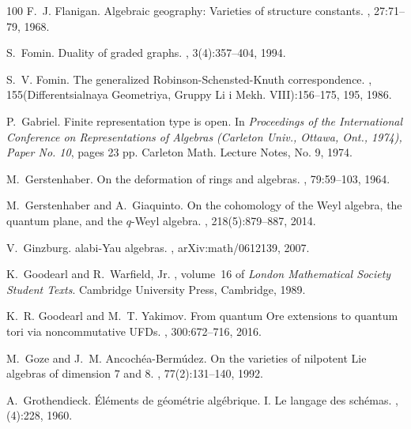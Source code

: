 \documentclass{commat}
\begin{document}
\begin{thebibliography}{100}
F.~J. Flanigan.
\newblock Algebraic geography: {V}arieties of structure constants.
, 27:71--79, 1968.

S.~Fomin.
\newblock Duality of graded graphs.
, 3(4):357--404, 1994.

S.~V. Fomin.
\newblock The generalized {R}obinson-{S}chensted-{K}nuth correspondence.
,
  155(Differentsial\cprime naya Geometriya, Gruppy Li i Mekh. VIII):156--175,
  195, 1986.

P.~Gabriel.
\newblock Finite representation type is open.
\newblock In {\em Proceedings of the {I}nternational {C}onference on
  {R}epresentations of {A}lgebras ({C}arleton {U}niv., {O}ttawa, {O}nt., 1974),
  {P}aper {N}o. 10}, pages 23 pp. Carleton Math. Lecture Notes, No. 9, 1974.

M.~Gerstenhaber.
\newblock On the deformation of rings and algebras.
, 79:59--103, 1964.

M.~Gerstenhaber and A.~Giaquinto.
\newblock On the cohomology of the {W}eyl algebra, the quantum plane, and the
  {$q$}-{W}eyl algebra.
, 218(5):879--887, 2014.

V.~Ginzburg.
alabi-{Y}au algebras.
, arXiv:math/0612139, 2007.

K.~Goodearl and R.~Warfield, Jr.
,
  volume~16 of {\em London Mathematical Society Student Texts}.
\newblock Cambridge University Press, Cambridge, 1989.

K.~R. Goodearl and M.~T. Yakimov.
\newblock From quantum {O}re extensions to quantum tori via noncommutative
  {UFD}s.
, 300:672--716, 2016.

M.~Goze and J.~M. Ancoch\'{e}a-Berm\'{u}dez.
\newblock On the varieties of nilpotent {L}ie algebras of dimension {$7$} and
  {$8$}.
, 77(2):131--140, 1992.

A.~Grothendieck.
\newblock \'{E}l\'{e}ments de g\'{e}om\'{e}trie alg\'{e}brique. {I}. {L}e
  langage des sch\'{e}mas.
, (4):228, 1960.


\end{thebibliography}
\end{document}
